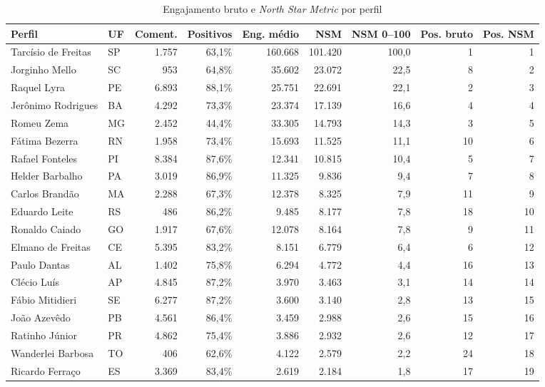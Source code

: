 \begin{table}[htb]
\centering
\caption{Engajamento bruto e \emph{North Star Metric} por perfil}
\label{tab:nsm}
\scriptsize\setlength{\tabcolsep}{3pt}
\begin{tabular}{llrrrrrrr}
\toprule
\textbf{Perfil} & \textbf{UF} & \textbf{Coment.} & \textbf{Positivos} & \textbf{Eng. médio} & \textbf{NSM} & \textbf{NSM 0--100} & \textbf{Pos. bruto} & \textbf{Pos. NSM} \\
\midrule
Tarcísio de Freitas & SP & 1.757 & 63,1\% & 160.668 & 101.420 & 100,0 & 1 & 1 \\
Jorginho Mello & SC & 953 & 64,8\% & 35.602 & 23.072 & 22,5 & 8 & 2 \\
Raquel Lyra & PE & 6.893 & 88,1\% & 25.751 & 22.691 & 22,1 & 2 & 3 \\
Jerônimo Rodrigues & BA & 4.292 & 73,3\% & 23.374 & 17.139 & 16,6 & 4 & 4 \\
Romeu Zema & MG & 2.452 & 44,4\% & 33.305 & 14.793 & 14,3 & 3 & 5 \\
Fátima Bezerra & RN & 1.958 & 73,4\% & 15.693 & 11.525 & 11,1 & 10 & 6 \\
Rafael Fonteles & PI & 8.384 & 87,6\% & 12.341 & 10.815 & 10,4 & 5 & 7 \\
Helder Barbalho & PA & 3.019 & 86,9\% & 11.325 & 9.836 & 9,4 & 7 & 8 \\
Carlos Brandão & MA & 2.288 & 67,3\% & 12.378 & 8.325 & 7,9 & 11 & 9 \\
Eduardo Leite & RS & 486 & 86,2\% & 9.485 & 8.177 & 7,8 & 18 & 10 \\
Ronaldo Caiado & GO & 1.917 & 67,6\% & 12.078 & 8.164 & 7,8 & 9 & 11 \\
Elmano de Freitas & CE & 5.395 & 83,2\% & 8.151 & 6.779 & 6,4 & 6 & 12 \\
Paulo Dantas & AL & 1.402 & 75,8\% & 6.294 & 4.772 & 4,4 & 16 & 13 \\
Clécio Luís & AP & 4.845 & 87,2\% & 3.970 & 3.463 & 3,1 & 14 & 14 \\
Fábio Mitidieri & SE & 6.277 & 87,2\% & 3.600 & 3.140 & 2,8 & 13 & 15 \\
João Azevêdo & PB & 4.561 & 86,4\% & 3.459 & 2.988 & 2,6 & 15 & 16 \\
Ratinho Júnior & PR & 4.862 & 75,4\% & 3.886 & 2.932 & 2,6 & 12 & 17 \\
Wanderlei Barbosa & TO & 406 & 62,6\% & 4.122 & 2.579 & 2,2 & 24 & 18 \\
Ricardo Ferraço & ES & 3.369 & 83,4\% & 2.619 & 2.184 & 1,8 & 17 & 19 \\

\end{tabular}
\end{table}

